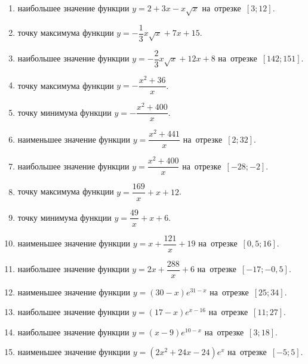 \documentclass[a4paper,10pt]{article}
\begin{document}
\begin{enumerate}
\item {} наибольшее значение функции $y=2+3x -x\sqrt{x}$ на~отрезке~$\left[3;12\right]$.

\item {} точку максимума функции $y=-\dfrac{1}{3}x\sqrt{x} +7x+15$.

\item {} наибольшее значение функции $y=-\dfrac{2}{3}x\sqrt{x} +12x+8$ на~отрезке~$\left[142;151\right]$.

\item {} точку максимума функции $y=-\dfrac{x^2 +36}{x}$.

\item {} точку минимума функции $y=-\dfrac{x^2 +400}{x}$.

\item {} наименьшее значение функции $y=\dfrac{x^2 +441}{x}$ на~отрезке~$\left[2;32\right]$.

\item {} наибольшее значение функции $y=\dfrac{x^2 +400}{x}$ на~отрезке~$\left[-28;-2\right]$.

\item {} точку максимума функции $y=\dfrac{169}{x} +x+12$.

\item {} точку минимума функции $y=\dfrac{49}{x} +x+6$.

\item {} наименьшее значение функции $y=x+\dfrac{121}{x} +19$ на~отрезке~$\left[0,5;16\right]$.

\item {} наибольшее значение функции $y=2x+\dfrac{288}{x} +6$ на~отрезке~$\left[-17;-0,5\right]$.

\item {} наименьшее значение функции $y=\left(30-x\right)e^{31-x}$ на~отрезке~$\left[25;34\right]$.

\item {} наибольшее значение функции $y=\left(17-x\right)e^{x-16}$ на~отрезке~$\left[11;27\right]$.

\item {} наибольшее значение функции $y=\left(x-9\right)e^{10-x}$ на~отрезке~$\left[3;18\right]$.

\item {} наименьшее значение функции $y=\left(2x^2 +24x -24\right)e^{x }$ на~отрезке~$\left[-5;5\right]$.


\end{enumerate}
\end{document}
